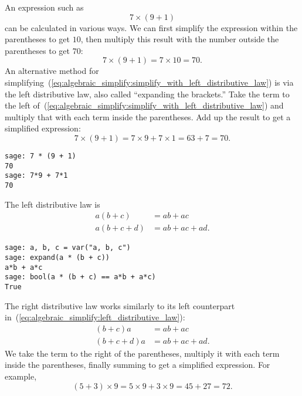 An expression such as
%
\begin{equation}
\label{eq:algebraic_simplify:simplify_with_left_distributive_law}
7 \times (9 + 1)
\end{equation}
%
can be calculated in various ways. We can first simplify the
expression within the parentheses to get $10$, then multiply this
result with the number outside the parentheses to get $70$:
\[
7 \times (9 + 1)
=
7 \times 10
=
70.
\]
An alternative method for
simplifying~(\ref{eq:algebraic_simplify:simplify_with_left_distributive_law})
is via the left distributive law, also
called ``expanding the brackets.'' Take the term to the left
of~(\ref{eq:algebraic_simplify:simplify_with_left_distributive_law})
and multiply that with each term inside the parentheses. Add up the
result to get a simplified expression:
\[
7 \times (9 + 1)
=
7 \times 9 + 7 \times 1
=
63 + 7
=
70.
\]
%
\begin{lstlisting}
sage: 7 * (9 + 1)
70
sage: 7*9 + 7*1
70
\end{lstlisting}
%
The left distributive law is
%
\begin{equation}
\label{eq:algebraic_simplify:left_distributive_law}
\begin{aligned}
a(b + c) &= ab + ac \\
a(b + c + d) &= ab + ac + ad.
\end{aligned}
\end{equation}

\begin{lstlisting}
sage: a, b, c = var("a, b, c")
sage: expand(a * (b + c))
a*b + a*c
sage: bool(a * (b + c) == a*b + a*c)
True
\end{lstlisting}

The right distributive law works
similarly to its left counterpart
in~(\ref{eq:algebraic_simplify:left_distributive_law}):
%
\begin{equation}
\label{eq:algebraic_simplify:right_distributive_law}
\begin{aligned}
(b + c)a &= ab + ac \\
(b + c + d)a &= ab + ac + ad.
\end{aligned}
\end{equation}
%
We take the term to the right of the parentheses, multiply it with
each term inside the parentheses, finally summing to get a simplified
expression. For example,
\[
(5 + 3) \times 9
=
5 \times 9 + 3 \times 9
=
45 + 27
=
72.
\]

